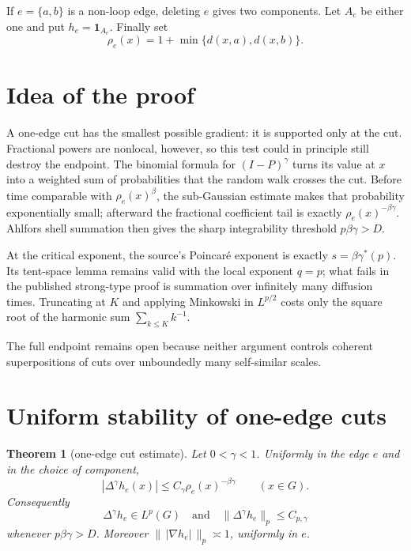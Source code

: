 \documentclass[11pt]{article}
\newtheorem{theorem}{Theorem}
\theoremstyle{remark}
\begin{document}
If $e=\{a,b\}$ is a non-loop edge, deleting $e$ gives two components.  Let
$A_e$ be either one and put $h_e=\mathbf 1_{A_e}$.  Finally set
\[
 \rho_e(x)=1+\min\{d(x,a),d(x,b)\}.
\]

\section{Idea of the proof}

A one-edge cut has the smallest possible gradient: it is supported only at
the cut.  Fractional powers are nonlocal, however, so this test could in
principle still destroy the endpoint.  The binomial formula for
$(I-P)^\gamma$ turns its value at $x$ into a weighted sum of probabilities
that the random walk crosses the cut.  Before time comparable with
$\rho_e(x)^\beta$, the sub-Gaussian estimate makes that probability
exponentially small; afterward the fractional coefficient tail is exactly
$\rho_e(x)^{-\beta\gamma}$.  Ahlfors shell summation then gives the sharp
integrability threshold $p\beta\gamma>D$.

At the critical exponent, the source's Poincar\'e exponent is exactly
$s=\beta\gamma^*(p)$.  Its tent-space lemma remains valid with the local
exponent $q=p$; what fails in the published strong-type proof is summation
over infinitely many diffusion times.  Truncating at $K$ and applying
Minkowski in $L^{p/2}$ costs only the square root of the harmonic sum
$\sum_{k\leq K}k^{-1}$.

The full endpoint remains open because neither argument controls coherent
superpositions of cuts over unboundedly many self-similar scales.

\section{Uniform stability of one-edge cuts}

\begin{theorem}[one-edge cut estimate]\label{thm:cut}
Let $0<\gamma<1$.  Uniformly in the edge $e$ and in the choice of component,
\[
 |\Delta^\gamma h_e(x)|\leq C_\gamma\rho_e(x)^{-\beta\gamma}
 \qquad (x\in G).
 \tag{4.1}
\]
Consequently
\[
 \Delta^\gamma h_e\in L^p(G)
 \quad\text{and}\quad
 \|\Delta^\gamma h_e\|_p\leq C_{p,\gamma}
 \tag{4.2}
\]
whenever $p\beta\gamma>D$.  Moreover
$\|\,|\nabla h_e|\,\|_p\asymp1$, uniformly in $e$.
\end{theorem}
\end{document}
